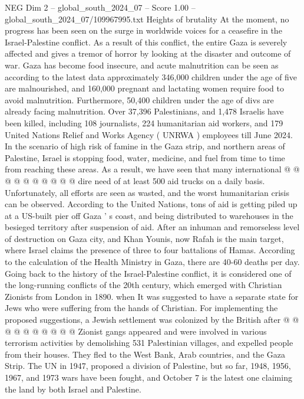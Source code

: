 \begin{textsample}{NEG Dim 2 – global\_south\_2024\_07 – Score 1.00 – global\_south\_2024\_07/109967995.txt}  \label{ex:f2_neg_383}
Heights of brutality At the moment, no progress has been seen on the surge in worldwide voices for a ceasefire in the Israel-Palestine conflict.
As a result of this conflict, the entire Gaza is severely affected and gives a tremor of horror by looking at the disaster and outcome of war.
Gaza has become food insecure, and acute malnutrition can be seen as according to the latest data approximately 346,000 children under the age of five are malnourished, and 160,000 pregnant and lactating women require food to avoid malnutrition.
Furthermore, 50,400 children under the age of divs are already facing malnutrition.
Over 37,396 Palestinians, and 1,478 Israelis have been killed, including 108 journalists, 224 humanitarian aid workers, and 179 United Nations Relief and Works Agency ( UNRWA ) employees till June 2024.
In the scenario of high risk of famine in the Gaza strip, and northern areas of Palestine, Israel is stopping food, water, medicine, and fuel from time to time from reaching these areas.
As a result, we have seen that many international @ @ @ @ @ @ @ @ @ @ dire need of at least 500 aid trucks on a daily basis.
Unfortunately, all efforts are seen as wasted, and the worst humanitarian crisis can be observed.
According to the United Nations, tons of aid is getting piled up at a US-built pier off Gaza ' s coast, and being distributed to warehouses in the besieged territory after suspension of aid.
After an inhuman and remorseless level of destruction on Gaza city, and Khan Younis, now Rafah is the main target, where Israel claims the presence of three to four battalions of Hamas.
According to the calculation of the Health Ministry in Gaza, there are 40-60 deaths per day.
Going back to the history of the Israel-Palestine conflict, it is considered one of the long-running conflicts of the 20th century, which emerged with Christian Zionists from London in 1890. when It was suggested to have a separate state for Jews who were suffering from the hands of Christian.
For implementing the proposed suggestions, a Jewish settlement was colonized by the British after @ @ @ @ @ @ @ @ @ @ Zionist gangs appeared and were involved in various terrorism activities by demolishing 531 Palestinian villages, and expelled people from their houses.
They fled to the West Bank, Arab countries, and the Gaza Strip.
The UN in 1947, proposed a division of Palestine, but so far, 1948, 1956, 1967, and 1973 wars have been fought, and October 7 is the latest one claiming the land by both Israel and Palestine.

\end{textsample}
